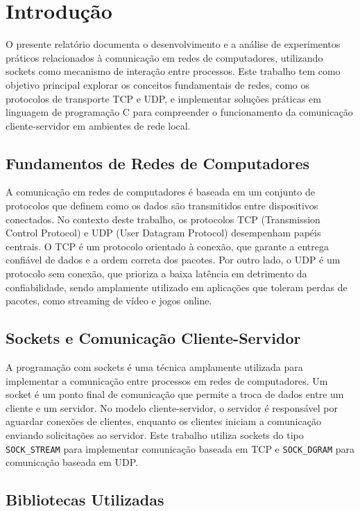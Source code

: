 \section*{Introdução}

O presente relatório documenta o desenvolvimento e a análise de experimentos práticos relacionados à comunicação em redes de computadores, utilizando sockets como mecanismo de interação entre processos. Este trabalho tem como objetivo principal explorar os conceitos fundamentais de redes, como os protocolos de transporte TCP e UDP, e implementar soluções práticas em linguagem de programação C para compreender o funcionamento da comunicação cliente-servidor em ambientes de rede local.

\subsection*{Fundamentos de Redes de Computadores}

A comunicação em redes de computadores é baseada em um conjunto de protocolos que definem como os dados são transmitidos entre dispositivos conectados. No contexto deste trabalho, os protocolos TCP (Transmission Control Protocol) e UDP (User Datagram Protocol) desempenham papéis centrais. O TCP é um protocolo orientado à conexão, que garante a entrega confiável de dados e a ordem correta dos pacotes. Por outro lado, o UDP é um protocolo sem conexão, que prioriza a baixa latência em detrimento da confiabilidade, sendo amplamente utilizado em aplicações que toleram perdas de pacotes, como streaming de vídeo e jogos online.

\subsection*{Sockets e Comunicação Cliente-Servidor}

A programação com sockets é uma técnica amplamente utilizada para implementar a comunicação entre processos em redes de computadores. Um socket é um ponto final de comunicação que permite a troca de dados entre um cliente e um servidor. No modelo cliente-servidor, o servidor é responsável por aguardar conexões de clientes, enquanto os clientes iniciam a comunicação enviando solicitações ao servidor. Este trabalho utiliza sockets do tipo \texttt{SOCK\_STREAM} para implementar comunicação baseada em TCP e \texttt{SOCK\_DGRAM} para comunicação baseada em UDP.

\subsection*{Bibliotecas Utilizadas}

